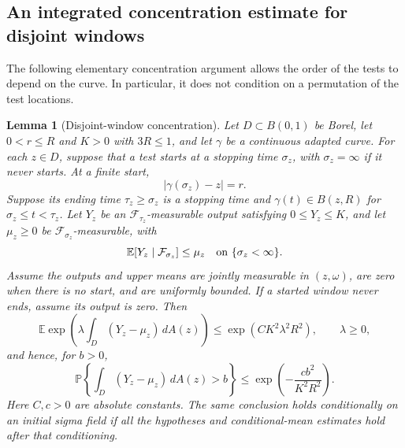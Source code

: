 \documentclass[11pt]{article}
\newtheorem{lemma}[theorem]{Lemma}
\theoremstyle{definition}
\theoremstyle{remark}
\numberwithin{equation}{section}
\begin{document}
\subsection{An integrated concentration estimate for disjoint windows}

The following elementary concentration argument allows the order of the
tests to depend on the curve.  In particular, it does not condition on a
permutation of the test locations.

\begin{lemma}[Disjoint-window concentration]\label{win:concentration}
Let $D\subset B(0,1)$ be Borel, let $0<r\le R$ and $K>0$ with $3R\le1$, and let
$\gamma$ be a continuous adapted curve.  For each $z\in D$, suppose that
a test starts at a stopping time $\sigma_z$, with $\sigma_z=\infty$ if it
never starts.  At a finite start,
\[
 |\gamma(\sigma_z)-z|=r.
\]
Suppose its ending time $\tau_z\ge\sigma_z$ is a stopping time and
$\gamma(t)\in B(z,R)$ for $\sigma_z\le t<\tau_z$.
Let $Y_z$ be an $\mathcal F_{\tau_z}$-measurable output satisfying
$0\le Y_z\le K$, and let $\mu_z\ge0$ be $\mathcal F_{\sigma_z}$-measurable,
with
\[
 \mathbb E[Y_z\mid\mathcal F_{\sigma_z}]\le\mu_z
 \quad\hbox{on }\{\sigma_z<\infty\}.
\]
Assume the outputs and upper means are jointly measurable in $(z,\omega)$,
are zero when there is no start, and are uniformly bounded.  If a started
window never ends, assume its output is zero.  Then
\begin{equation}
 \mathbb E\exp\left(\lambda\int_D(Y_z-\mu_z)\,dA(z)\right)
       \le \exp(CK^2\lambda^2 R^2),\qquad \lambda\ge0,
 \label{win:mgf}
\end{equation}
and hence, for $b>0$,
\begin{equation}
 \mathbb P\left\{\int_D(Y_z-\mu_z)\,dA(z)>b\right\}
       \le \exp\left(-\frac{c b^2}{K^2R^2}\right).
 \label{win:tail}
\end{equation}
Here $C,c>0$ are absolute constants.  The same conclusion holds
conditionally on an initial sigma field if all the hypotheses and
conditional-mean estimates hold after that conditioning.
\end{lemma}
\end{document}
